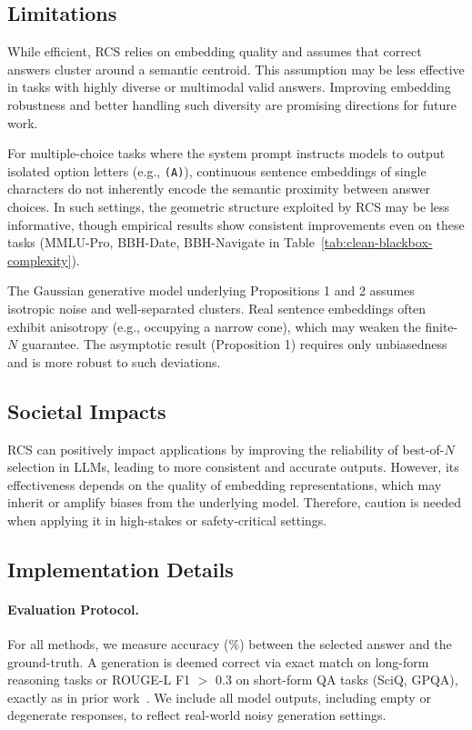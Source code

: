\subsection{Limitations}\label{app:limitation}
While efficient, RCS relies on embedding quality and assumes that correct answers cluster around a semantic centroid. This assumption may be less effective in tasks with highly diverse or multimodal valid answers. Improving embedding robustness and better handling such diversity are promising directions for future work.

For multiple-choice tasks where the system prompt instructs models to output isolated option letters (e.g., \texttt{(A)}), continuous sentence embeddings of single characters do not inherently encode the semantic proximity between answer choices. In such settings, the geometric structure exploited by RCS may be less informative, though empirical results show consistent improvements even on these tasks (MMLU-Pro, BBH-Date, BBH-Navigate in Table~\ref{tab:clean-blackbox-complexity}).

The Gaussian generative model underlying Propositions 1 and 2 assumes isotropic noise and well-separated clusters. Real sentence embeddings often exhibit anisotropy (e.g., occupying a narrow cone), which may weaken the finite-\(N\) guarantee. The asymptotic result (Proposition 1) requires only unbiasedness and is more robust to such deviations.

\subsection{Societal Impacts}\label{app:impact}

RCS can positively impact applications by improving the reliability of best-of-$N$ selection in LLMs, leading to more consistent and accurate outputs. However, its effectiveness depends on the quality of embedding representations, which may inherit or amplify biases from the underlying model. Therefore, caution is needed when applying it in high-stakes or safety-critical settings.

\subsection{Implementation Details} \label{app:details}

\paragraph{Evaluation Protocol.} For all methods, we measure accuracy (\%) between the selected answer and the ground-truth. A generation is deemed correct via exact match on long-form reasoning tasks or ROUGE-L F1 $>$ 0.3 on short-form QA tasks (SciQ, GPQA), exactly as in prior work~\citep{kuhn2023semantic, nguyen2025probabilities}. We include all model outputs, including empty or degenerate responses, to reflect real-world noisy generation settings.

